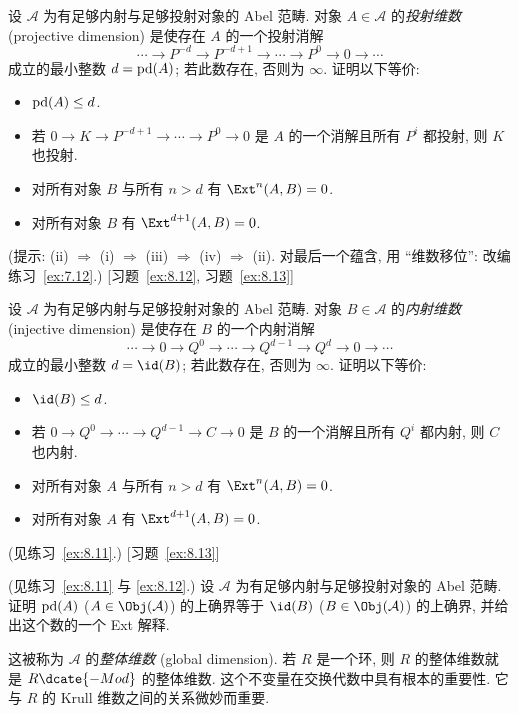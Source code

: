 \begin{prob}\label{ex:8.11}
设 $\mathcal{A}$ 为有足够内射与足够投射对象的 Abel 范畴. 对象 $A\in\mathcal{A}$ 的\emph{投射维数} (projective dimension) 是使存在 $A$ 的一个投射消解
\[
\cdots \longrightarrow P^{-d}\longrightarrow P^{-d+1}\longrightarrow \cdots \longrightarrow P^0\longrightarrow 0\longrightarrow \cdots
\]
成立的最小整数 $d=\operatorname{pd}(A)$; 若此数存在, 否则为 $\infty$. 证明以下等价:
\begin{itemize}
\item[(i)] $\operatorname{pd}(A)\le d$.
\item[(ii)] 若 $0\to K\to P^{-d+1}\to \cdots \to P^0\to 0$ 是 $A$ 的一个消解且所有 $P^i$ 都投射, 则 $K$ 也投射.
\item[(iii)] 对所有对象 $B$ 与所有 $n>d$ 有 $\Ext^n(A,B)=0$.
\item[(iv)] 对所有对象 $B$ 有 $\Ext^{d+1}(A,B)=0$.
\end{itemize}
(提示: (ii) $\Rightarrow$ (i) $\Rightarrow$ (iii) $\Rightarrow$ (iv) $\Rightarrow$ (ii). 对最后一个蕴含, 用 ``维数移位'': 改编练习~\ref{ex:7.12}.) [习题~\ref{ex:8.12}, 习题~\ref{ex:8.13}]
\end{prob}

\begin{prob}\label{ex:8.12}
设 $\mathcal{A}$ 为有足够内射与足够投射对象的 Abel 范畴. 对象 $B\in\mathcal{A}$ 的\emph{内射维数} (injective dimension) 是使存在 $B$ 的一个内射消解
\[
\cdots\longrightarrow 0\longrightarrow Q^0\longrightarrow\cdots\longrightarrow Q^{d-1}\longrightarrow Q^d\longrightarrow 0\longrightarrow\cdots
\]
成立的最小整数 $d=\id(B)$; 若此数存在, 否则为 $\infty$. 证明以下等价:
\begin{itemize}
\item[(i)] $\id(B)\le d$.
\item[(ii)] 若 $0\to Q^0\to \cdots \to Q^{d-1}\to C\to 0$ 是 $B$ 的一个消解且所有 $Q^i$ 都内射, 则 $C$ 也内射.
\item[(iii)] 对所有对象 $A$ 与所有 $n>d$ 有 $\Ext^n(A,B)=0$.
\item[(iv)] 对所有对象 $A$ 有 $\Ext^{d+1}(A,B)=0$.
\end{itemize}
(见练习~\ref{ex:8.11}.) [习题~\ref{ex:8.13}]
\end{prob}

\begin{prob}\label{ex:8.13}
(见练习~\ref{ex:8.11} 与 \ref{ex:8.12}.) 设 $\mathcal{A}$ 为有足够内射与足够投射对象的 Abel 范畴. 证明 $\operatorname{pd}(A)$ ($A\in\Obj(\mathcal{A})$) 的上确界等于 $\id(B)$ ($B\in\Obj(\mathcal{A})$) 的上确界, 并给出这个数的一个 Ext 解释.

这被称为 $\mathcal{A}$ 的\emph{整体维数} (global dimension). 若 $R$ 是一个环, 则 $R$ 的整体维数就是 $R\dcate{-Mod}$ 的整体维数. 这个不变量在交换代数中具有根本的重要性. 它与 $R$ 的 Krull 维数之间的关系微妙而重要.
\end{prob}

